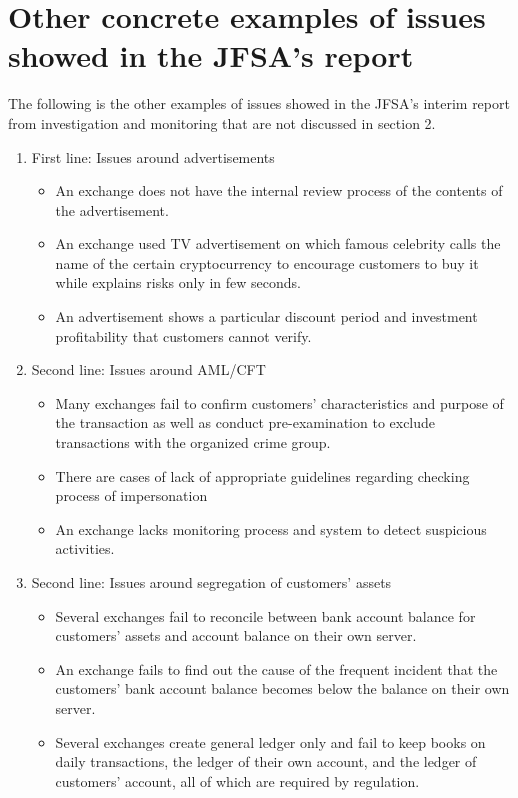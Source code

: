 \section{Other concrete examples of issues showed in the JFSA's report}
\label{appendix_report_examples}

The following is the other examples of issues showed in the JFSA's interim report from investigation and monitoring that are not discussed in section 2.

\begin{enumerate}
  \item First line: Issues around advertisements
   \begin{itemize}
     \item An exchange does not have the internal review process of the contents of the advertisement.
     \item An exchange used TV advertisement on which famous celebrity calls the name of the certain cryptocurrency to encourage customers to buy it while explains risks only in few seconds.
     \item An advertisement shows a particular discount period and investment profitability that customers cannot verify.
   \end{itemize}

  \item Second line: Issues around AML/CFT
  \begin{itemize}
    \item Many exchanges fail to confirm customers' characteristics and purpose of the transaction as well as conduct pre-examination to exclude transactions with the organized crime group.
    \item There are cases of lack of appropriate guidelines regarding checking process of impersonation
    \item An exchange lacks monitoring process and system to detect suspicious activities.
  \end{itemize}

  \item Second line: Issues around segregation of customers' assets
  \begin{itemize}
    \item Several exchanges fail to reconcile between bank account balance for customers' assets and account balance on their own server.
    \item An exchange fails to find out the cause of the frequent incident that the customers' bank account balance becomes below the balance on their own server.
    \item Several exchanges create general ledger only and fail to keep books on daily transactions, the ledger of their own account, and the ledger of customers' account, all of which are required by regulation.
  \end{itemize}


\end{enumerate}
